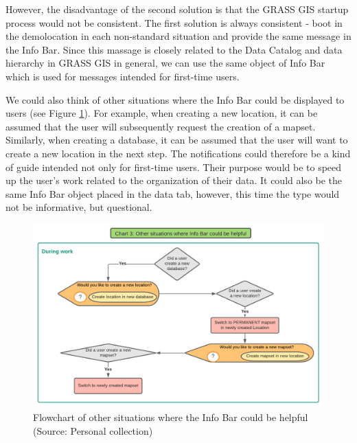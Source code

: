 \documentclass[a4paper,10pt,twoside]{article}
\begin{document}
\noindent However, the disadvantage of the second solution is that the GRASS GIS startup process would not be consistent. The first solution is always consistent - boot in the demolocation in each non-standard situation and provide the same message in the Info Bar. Since this massage is closely related to the Data Catalog and data hierarchy in GRASS GIS in general, we can use the same object of Info Bar which is used for messages intended for first-time users.

We could also think of other situations where the Info Bar could be displayed to users (see Figure \ref{fig:other_situations}). For example, when creating a new location, it can be assumed that the user will subsequently request the creation of a mapset. Similarly, when creating a database, it can be assumed that the user will want to create a new location in the next step. The notifications could therefore be a kind of guide intended not only for first-time users. Their purpose would be to speed up the user's work related to the organization of their data. It could also be the same Info Bar object placed in the data tab, however, this time the type would not be informative, but questional.

\vspace{0.3cm}
\begin{figure}[hbt!] 
\begin{center}
\includegraphics[width=17cm]{../pictures/other_situations.png} 
\caption[Flowchart of other situations where the Info Bar could be helpful]{Flowchart of other situations where the Info Bar could be helpful (Source: Personal collection)}
\label{fig:other_situations}
\end{center}
\end{figure}
\end{document}
